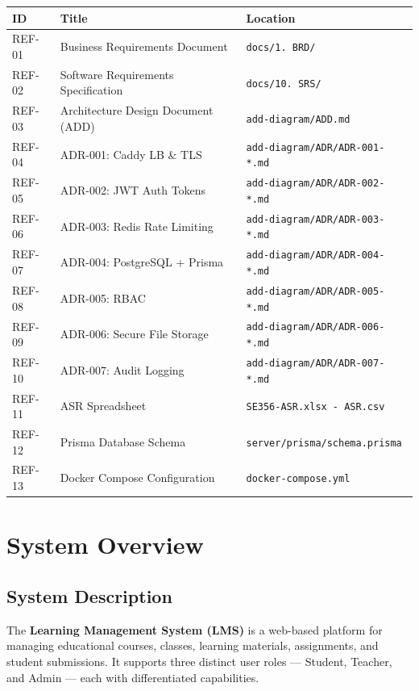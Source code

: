 \documentclass[12pt,a4paper]{article}
\begin{document}
\begin{tabularx}{\textwidth}{C{1.5cm} L{4.5cm} L{7.5cm}}
  \toprule
  \textbf{ID} & \textbf{Title} & \textbf{Location} \\
  \midrule
  REF-01 & Business Requirements Document & \texttt{docs/1. BRD/} \\
  REF-02 & Software Requirements Specification & \texttt{docs/10. SRS/} \\
  REF-03 & Architecture Design Document (ADD) & \texttt{add-diagram/ADD.md} \\
  REF-04 & ADR-001: Caddy LB \& TLS & \texttt{add-diagram/ADR/ADR-001-*.md} \\
  REF-05 & ADR-002: JWT Auth Tokens & \texttt{add-diagram/ADR/ADR-002-*.md} \\
  REF-06 & ADR-003: Redis Rate Limiting & \texttt{add-diagram/ADR/ADR-003-*.md} \\
  REF-07 & ADR-004: PostgreSQL + Prisma & \texttt{add-diagram/ADR/ADR-004-*.md} \\
  REF-08 & ADR-005: RBAC & \texttt{add-diagram/ADR/ADR-005-*.md} \\
  REF-09 & ADR-006: Secure File Storage & \texttt{add-diagram/ADR/ADR-006-*.md} \\
  REF-10 & ADR-007: Audit Logging & \texttt{add-diagram/ADR/ADR-007-*.md} \\
  REF-11 & ASR Spreadsheet & \texttt{SE356-ASR.xlsx - ASR.csv} \\
  REF-12 & Prisma Database Schema & \texttt{server/prisma/schema.prisma} \\
  REF-13 & Docker Compose Configuration & \texttt{docker-compose.yml} \\
  \bottomrule
\end{tabularx}

\section{System Overview}

\subsection{System Description}

The \textbf{Learning Management System (LMS)} is a web-based platform for managing educational courses, classes, learning materials, assignments, and student submissions. It supports three distinct user roles --- Student, Teacher, and Admin --- each with differentiated capabilities.
\end{document}
